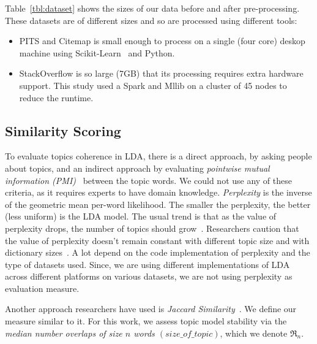 \documentclass[10pt,conference]{IEEEtran}
\newcommand{\bi}{\begin{itemize}}
\newcommand{\ei}{\end{itemize}}
\theoremstyle{break}
\begin{document}
  Table~\ref{tbl:dataset} shows the sizes of our data before and after pre-processing.
  These datasets are of different sizes and so are processed using different tools:
  \bi
\item PITS and Citemap is small enough to process on a single (four core) deskop machine
  using Scikit-Learn~\cite{pedregosa2011scikit} and Python.
  \item StackOverflow is so large (7GB) that its  processing requires extra hardware support.
 This study used a Spark and Mllib on a cluster of 45 nodes to
 reduce the runtime.
 \ei
  




\subsection{Similarity Scoring}
To evaluate topics coherence in LDA, there is a direct approach, by asking people about topics, and an indirect approach by evaluating \textit{pointwise mutual information (PMI)}~\cite{lau2014machine, o2015analysis} between the topic words. We could not use any of these criteria, as it requires experts to have domain knowledge. \textit{Perplexity} is  the inverse of the geometric mean per-word likelihood. The smaller the perplexity, the better (less uniform) is the LDA model. The usual trend is that as the value of perplexity drops, the number of topics should grow~\cite{koltcov2014latent}. Researchers caution that the value of perplexity doesn't remain constant with different topic size and with dictionary sizes~\cite{koltcov2014latent, zhao2015heuristic}. A lot depend on the code implementation of perplexity and the type of datasets used. Since, we are using different implementations of LDA across different platforms on various datasets, we are not using perplexity as evaluation measure.

Another approach researchers have used is \textit{Jaccard Similarity}~\cite{o2015analysis, galvis2013analysis}. We define our measure similar to it. For this work, we assess topic model stability via the {\em median number overlaps of size $n$ words $\mathit{(size\_of\_topic)}$}, which we denote  $\Re_n$.
\end{document}
